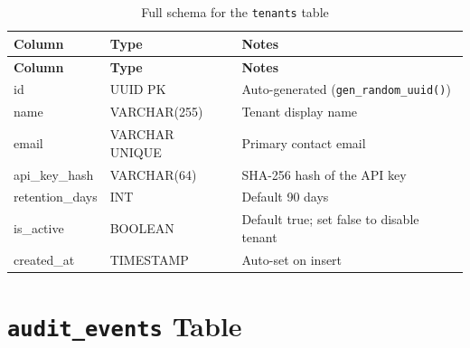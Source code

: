\documentclass[a4paper,12pt,onecolumn]{report}
\begin{document}
\begin{longtable}{|l|l|p{6cm}|}
    \caption{Full schema for the \texttt{tenants} table} \label{tab:tenants-schema} \\
    \hline
    \textbf{Column} & \textbf{Type} & \textbf{Notes} \\
    \hline
    \endfirsthead
    \hline
    \textbf{Column} & \textbf{Type} & \textbf{Notes} \\
    \hline
    \endhead
    id & UUID PK & Auto-generated (\texttt{gen\_random\_uuid()}) \\
    \hline
    name & VARCHAR(255) & Tenant display name \\
    \hline
    email & VARCHAR UNIQUE & Primary contact email \\
    \hline
    api\_key\_hash & VARCHAR(64) & SHA-256 hash of the API key \\
    \hline
    retention\_days & INT & Default 90 days \\
    \hline
    is\_active & BOOLEAN & Default true; set false to disable tenant \\
    \hline
    created\_at & TIMESTAMP & Auto-set on insert \\
    \hline
\end{longtable}

\section{\texttt{audit\_events} Table}
\end{document}
